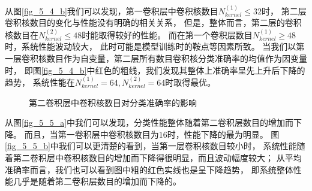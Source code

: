 从图\ref{fig_5_4_b}我们可以发现，第一卷积层中卷积核数目$N_{kernel}^{(1)} \leq 32$时，
第二层卷积核数目的变化与性能没有明确的相关关系，
但是，整体而言，第二层的卷积核数目在$N_{kernel}^{(2)} \leq 48$时能取得较好的性能。
而在第一个卷积层数目$N_{kernel}^{(1)} \geq 48$时，系统性能波动较大，
此时可能是模型训练时的鞍点等因素所致。
当我们以第一层卷积核数目作为自变量，第二层所有数目卷积核分类准确率的均值作为因变量时，
即图\ref{fig_5_4_b}中红色的粗线，我们发现其整体上准确率呈先上升后下降的趋势，
系统性能在$N_{kernel}^{(1)} = 64, N_{kernel}^{(2)} =64$时取得最优。
\par

\begin{figure}[!h]
	\centering
	\caption{第二卷积层中卷积核数目对分类准确率的影响}
	\label{fig_5_5}
\end{figure}
从图\ref{fig_5_5_a}中我们可以发现，分类性能整体随着第二卷积层数目的增加而下降。
而且，当第一卷积层中卷积核数目为$16$时，性能下降的最为明显。
图\ref{fig_5_5_b}中我们可以更清楚的看到，当第一层卷积核数目较小时，
系统性能随着第二卷积层中卷积核数目的增加而下降得很明显，而且波动幅度较大；
从平均准确率而言，我们也可以看到图中粗的红色实线也是呈下降趋势，
即系统整体性能几乎是随着第二卷积层数目的增加而下降的。
